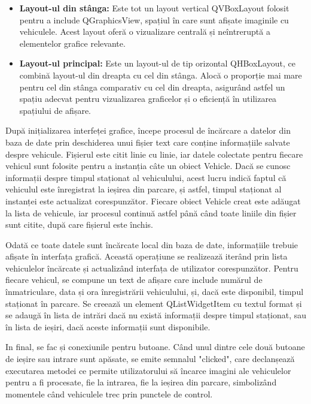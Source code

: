 \documentclass[a4paper,12pt]{report}
\begin{document}
\begin{itemize}
    \item \textbf{Layout-ul din stânga:} Este tot un layout vertical QVBoxLayout folosit pentru a include QGraphicsView, spațiul în care sunt afișate imaginile cu vehiculele. Acest layout oferă o vizualizare centrală și neîntreruptă a elementelor grafice relevante.

    \item \textbf{Layout-ul principal:} Este un layout-ul de tip orizontal QHBoxLayout, ce combină layout-ul din dreapta cu cel din stânga. Alocă o proporție mai mare pentru cel din stânga comparativ cu cel din dreapta, asigurând astfel un spațiu adecvat pentru vizualizarea graficelor și o eficiență în utilizarea spațiului de afișare.
\end{itemize}
După inițializarea interfeței grafice, începe procesul de încărcare a datelor din baza de date prin deschiderea unui fișier text care conține informațiile salvate despre vehicule. Fișierul este citit linie cu linie, iar datele colectate pentru fiecare vehicul sunt folosite pentru a instanția câte un obiect Vehicle. Dacă se cunosc informații despre timpul staționat al vehiculului, acest lucru indică faptul că vehiculul este înregistrat la ieșirea din parcare, și astfel, timpul staționat al instanței este actualizat corespunzător. Fiecare obiect Vehicle creat este adăugat la lista de vehicule, iar procesul continuă astfel până când toate liniile din fișier sunt citite, după care fișierul este închis.

Odată ce toate datele sunt încărcate local din baza de date, informațiile trebuie afișate în interfața grafică. Această operațiune se realizează iterând prin lista vehiculelor încărcate și actualizând interfața de utilizator corespunzător. Pentru fiecare vehicul, se compune un text de afișare care include numărul de înmatriculare, data și ora înregistrării vehiculului, și, dacă este disponibil, timpul staționat în parcare. Se creează un element QListWidgetItem cu textul format și se adaugă în lista de intrări dacă nu există informații despre timpul staționat, sau în lista de ieșiri, dacă aceste informații sunt disponibile.

In final, se fac și conexiunile pentru butoane. Când unul dintre cele două butoane de ieșire sau intrare sunt apăsate, se emite semnalul "clicked", care declanșează executarea metodei ce permite utilizatorului să încarce imagini ale vehiculelor pentru a fi procesate, fie la intrarea, fie la ieșirea din parcare, simbolizând momentele când vehiculele trec prin punctele de control.
\end{document}
